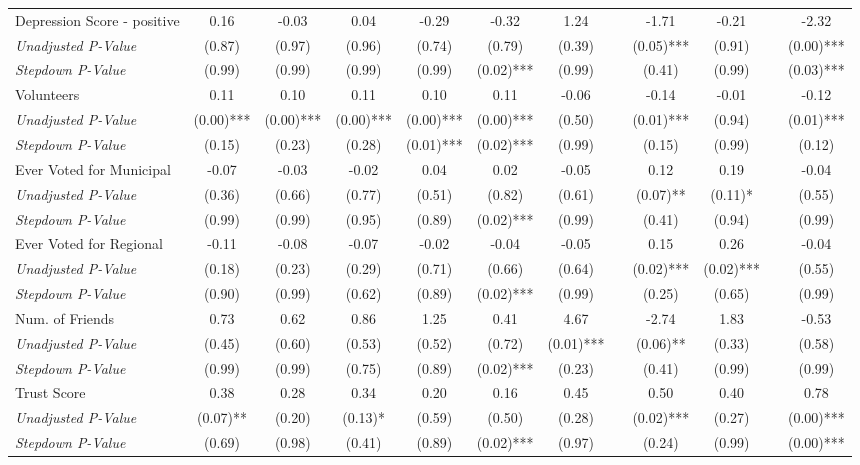 \begin{tabular}{l c c c c c c c c c c c}
Depression Score - positive & 0.16 & -0.03 & 0.04 & -0.29 & -0.32 & 1.24 & & -1.71 & -0.21 & & -2.32 \\
\quad \textit{Unadjusted P-Value} & (0.87) & (0.97) & (0.96) & (0.74) & (0.79) & (0.39) & & (0.05)*** & (0.91) & & (0.00)*** \\
\quad \textit{Stepdown P-Value} & (0.99) & (0.99) & (0.99) & (0.99) & (0.02)*** & (0.99) & & (0.41) & (0.99) & & (0.03)*** \\
Volunteers & 0.11 & 0.10 & 0.11 & 0.10 & 0.11 & -0.06 & & -0.14 & -0.01 & & -0.12 \\
\quad \textit{Unadjusted P-Value} & (0.00)*** & (0.00)*** & (0.00)*** & (0.00)*** & (0.00)*** & (0.50) & & (0.01)*** & (0.94) & & (0.01)*** \\
\quad \textit{Stepdown P-Value} & (0.15) & (0.23) & (0.28) & (0.01)*** & (0.02)*** & (0.99) & & (0.15) & (0.99) & & (0.12) \\
Ever Voted for Municipal & -0.07 & -0.03 & -0.02 & 0.04 & 0.02 & -0.05 & & 0.12 & 0.19 & & -0.04 \\
\quad \textit{Unadjusted P-Value} & (0.36) & (0.66) & (0.77) & (0.51) & (0.82) & (0.61) & & (0.07)** & (0.11)* & & (0.55) \\
\quad \textit{Stepdown P-Value} & (0.99) & (0.99) & (0.95) & (0.89) & (0.02)*** & (0.99) & & (0.41) & (0.94) & & (0.99) \\
Ever Voted for Regional & -0.11 & -0.08 & -0.07 & -0.02 & -0.04 & -0.05 & & 0.15 & 0.26 & & -0.04 \\
\quad \textit{Unadjusted P-Value} & (0.18) & (0.23) & (0.29) & (0.71) & (0.66) & (0.64) & & (0.02)*** & (0.02)*** & & (0.55) \\
\quad \textit{Stepdown P-Value} & (0.90) & (0.99) & (0.62) & (0.89) & (0.02)*** & (0.99) & & (0.25) & (0.65) & & (0.99) \\
Num. of Friends & 0.73 & 0.62 & 0.86 & 1.25 & 0.41 & 4.67 & & -2.74 & 1.83 & & -0.53 \\
\quad \textit{Unadjusted P-Value} & (0.45) & (0.60) & (0.53) & (0.52) & (0.72) & (0.01)*** & & (0.06)** & (0.33) & & (0.58) \\
\quad \textit{Stepdown P-Value} & (0.99) & (0.99) & (0.75) & (0.89) & (0.02)*** & (0.23) & & (0.41) & (0.99) & & (0.99) \\
Trust Score & 0.38 & 0.28 & 0.34 & 0.20 & 0.16 & 0.45 & & 0.50 & 0.40 & & 0.78 \\
\quad \textit{Unadjusted P-Value} & (0.07)** & (0.20) & (0.13)* & (0.59) & (0.50) & (0.28) & & (0.02)*** & (0.27) & & (0.00)*** \\
\quad \textit{Stepdown P-Value} & (0.69) & (0.98) & (0.41) & (0.89) & (0.02)*** & (0.97) & & (0.24) & (0.99) & & (0.00)*** \\
\bottomrule
\end{tabular}
